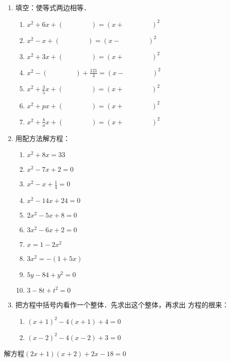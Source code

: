 \begin{ex}
\begin{enumerate}
    \item 填空：使等式两边相等．
\begin{enumerate}
    \item $x^2+6x+(\qquad \qquad  )=(x+ \qquad \qquad )^2$
    \item $x^2-x+(\qquad \qquad  )=(x- \qquad \qquad )^2$
    \item $x^2+3x+(\qquad \qquad  )=(x+ \qquad \qquad )^2$
    \item $x^2-(\qquad \qquad )+\frac{121}{4}=(x-\qquad \qquad )^2$
    \item $x^2+\frac{3}{5}x+(\qquad \qquad )=(x+\qquad \qquad )^2$
     \item $x^2+px+(\qquad \qquad  )=(x+\qquad \qquad )^2$
     \item $x^2+\frac{b}{a}x+(\qquad \qquad )=(x+\qquad \qquad )^2$
\end{enumerate}

\item 用配方法解方程：
\begin{multicols}{2}
    \begin{enumerate}
\item $x^2+8x=33$
\item $x^2-7x+2=0$
\item $x^2-x+\frac{1}{4}=0$
\item $x^2-14x+24=0$
\item $2x^2-5x+8=0$
\item $3x^2-6x+2=0$
\item $x=1-2x^2$
\item $3x^2=-(1+5x)$
\item $5y-84+y^2=0$
\item $3-8t+t^2=0$
\end{enumerate}
\end{multicols}


\item 把方程中括号内看作一个整体．先求出这个整体，再求出
方程的根来：
\begin{enumerate}
    \item $(x+1)^2-4(x+1)+4=0$
    \item $(x-2)^2-4(x-2)+3=0$
\end{enumerate}
\end{enumerate}
\end{ex}




\begin{example}
    解方程$(2x+1)(x+2)+2x-18=0$
\end{example}



